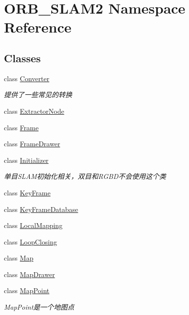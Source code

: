 \hypertarget{namespace_o_r_b___s_l_a_m2}{}\section{O\+R\+B\+\_\+\+S\+L\+A\+M2 Namespace Reference}
\label{namespace_o_r_b___s_l_a_m2}
\subsection*{Classes}
\begin{DoxyCompactItemize}
\item 
class \mbox{\hyperlink{class_o_r_b___s_l_a_m2_1_1_converter}{Converter}}
\begin{DoxyCompactList}\small\item\em 提供了一些常见的转换 \end{DoxyCompactList}\item 
class \mbox{\hyperlink{class_o_r_b___s_l_a_m2_1_1_extractor_node}{Extractor\+Node}}
\item 
class \mbox{\hyperlink{class_o_r_b___s_l_a_m2_1_1_frame}{Frame}}
\item 
class \mbox{\hyperlink{class_o_r_b___s_l_a_m2_1_1_frame_drawer}{Frame\+Drawer}}
\item 
class \mbox{\hyperlink{class_o_r_b___s_l_a_m2_1_1_initializer}{Initializer}}
\begin{DoxyCompactList}\small\item\em 单目\+S\+L\+A\+M初始化相关，双目和\+R\+G\+B\+D不会使用这个类 \end{DoxyCompactList}\item 
class \mbox{\hyperlink{class_o_r_b___s_l_a_m2_1_1_key_frame}{Key\+Frame}}
\item 
class \mbox{\hyperlink{class_o_r_b___s_l_a_m2_1_1_key_frame_database}{Key\+Frame\+Database}}
\item 
class \mbox{\hyperlink{class_o_r_b___s_l_a_m2_1_1_local_mapping}{Local\+Mapping}}
\item 
class \mbox{\hyperlink{class_o_r_b___s_l_a_m2_1_1_loop_closing}{Loop\+Closing}}
\item 
class \mbox{\hyperlink{class_o_r_b___s_l_a_m2_1_1_map}{Map}}
\item 
class \mbox{\hyperlink{class_o_r_b___s_l_a_m2_1_1_map_drawer}{Map\+Drawer}}
\item 
class \mbox{\hyperlink{class_o_r_b___s_l_a_m2_1_1_map_point}{Map\+Point}}
\begin{DoxyCompactList}\small\item\em Map\+Point是一个地图点 \end{DoxyCompactList}\item 

\end{DoxyCompactItemize}
